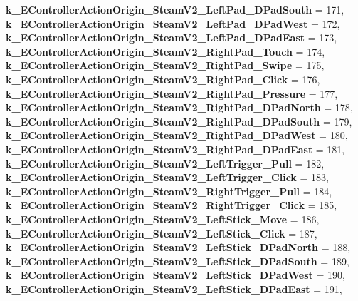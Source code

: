 \begin{DoxyCompactItemize}
{\bfseries k\+\_\+\+E\+Controller\+Action\+Origin\+\_\+\+Steam\+V2\+\_\+\+Left\+Pad\+\_\+\+D\+Pad\+South} = 171, 
\newline
{\bfseries k\+\_\+\+E\+Controller\+Action\+Origin\+\_\+\+Steam\+V2\+\_\+\+Left\+Pad\+\_\+\+D\+Pad\+West} = 172, 
{\bfseries k\+\_\+\+E\+Controller\+Action\+Origin\+\_\+\+Steam\+V2\+\_\+\+Left\+Pad\+\_\+\+D\+Pad\+East} = 173, 
{\bfseries k\+\_\+\+E\+Controller\+Action\+Origin\+\_\+\+Steam\+V2\+\_\+\+Right\+Pad\+\_\+\+Touch} = 174, 
{\bfseries k\+\_\+\+E\+Controller\+Action\+Origin\+\_\+\+Steam\+V2\+\_\+\+Right\+Pad\+\_\+\+Swipe} = 175, 
\newline
{\bfseries k\+\_\+\+E\+Controller\+Action\+Origin\+\_\+\+Steam\+V2\+\_\+\+Right\+Pad\+\_\+\+Click} = 176, 
{\bfseries k\+\_\+\+E\+Controller\+Action\+Origin\+\_\+\+Steam\+V2\+\_\+\+Right\+Pad\+\_\+\+Pressure} = 177, 
{\bfseries k\+\_\+\+E\+Controller\+Action\+Origin\+\_\+\+Steam\+V2\+\_\+\+Right\+Pad\+\_\+\+D\+Pad\+North} = 178, 
{\bfseries k\+\_\+\+E\+Controller\+Action\+Origin\+\_\+\+Steam\+V2\+\_\+\+Right\+Pad\+\_\+\+D\+Pad\+South} = 179, 
\newline
{\bfseries k\+\_\+\+E\+Controller\+Action\+Origin\+\_\+\+Steam\+V2\+\_\+\+Right\+Pad\+\_\+\+D\+Pad\+West} = 180, 
{\bfseries k\+\_\+\+E\+Controller\+Action\+Origin\+\_\+\+Steam\+V2\+\_\+\+Right\+Pad\+\_\+\+D\+Pad\+East} = 181, 
{\bfseries k\+\_\+\+E\+Controller\+Action\+Origin\+\_\+\+Steam\+V2\+\_\+\+Left\+Trigger\+\_\+\+Pull} = 182, 
{\bfseries k\+\_\+\+E\+Controller\+Action\+Origin\+\_\+\+Steam\+V2\+\_\+\+Left\+Trigger\+\_\+\+Click} = 183, 
\newline
{\bfseries k\+\_\+\+E\+Controller\+Action\+Origin\+\_\+\+Steam\+V2\+\_\+\+Right\+Trigger\+\_\+\+Pull} = 184, 
{\bfseries k\+\_\+\+E\+Controller\+Action\+Origin\+\_\+\+Steam\+V2\+\_\+\+Right\+Trigger\+\_\+\+Click} = 185, 
{\bfseries k\+\_\+\+E\+Controller\+Action\+Origin\+\_\+\+Steam\+V2\+\_\+\+Left\+Stick\+\_\+\+Move} = 186, 
{\bfseries k\+\_\+\+E\+Controller\+Action\+Origin\+\_\+\+Steam\+V2\+\_\+\+Left\+Stick\+\_\+\+Click} = 187, 
\newline
{\bfseries k\+\_\+\+E\+Controller\+Action\+Origin\+\_\+\+Steam\+V2\+\_\+\+Left\+Stick\+\_\+\+D\+Pad\+North} = 188, 
{\bfseries k\+\_\+\+E\+Controller\+Action\+Origin\+\_\+\+Steam\+V2\+\_\+\+Left\+Stick\+\_\+\+D\+Pad\+South} = 189, 
{\bfseries k\+\_\+\+E\+Controller\+Action\+Origin\+\_\+\+Steam\+V2\+\_\+\+Left\+Stick\+\_\+\+D\+Pad\+West} = 190, 
{\bfseries k\+\_\+\+E\+Controller\+Action\+Origin\+\_\+\+Steam\+V2\+\_\+\+Left\+Stick\+\_\+\+D\+Pad\+East} = 191, 
\newline

\end{DoxyCompactItemize}
